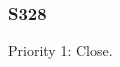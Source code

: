 
%
%




\clearpage
\subsubsection{S328}

\begin{packed_items}
\item Priority 1: Close.
\end{packed_items}

\clearpage
